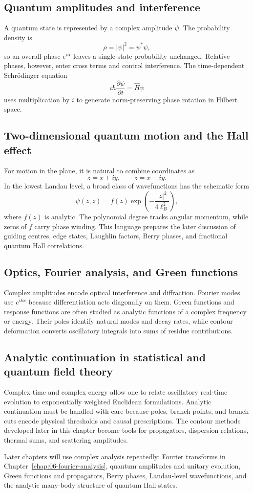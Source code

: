 \subsection{Quantum amplitudes and interference}
A quantum state is represented by a complex amplitude $\psi$. The probability density is
\[
\rho=|\psi|^2=\psi^*\psi,
\]
so an overall phase $e^{i\alpha}$ leaves a single-state probability unchanged. Relative phases, however, enter cross terms and control interference. The time-dependent Schr\"odinger equation
\[
i\hbar\frac{\partial\psi}{\partial t}=\hat H\psi
\]
uses multiplication by $i$ to generate norm-preserving phase rotation in Hilbert space.

\subsection{Two-dimensional quantum motion and the Hall effect}
For motion in the plane, it is natural to combine coordinates as
\[
z=x+iy,\qquad \bar z=x-iy.
\]
In the lowest Landau level, a broad class of wavefunctions has the schematic form
\[
\psi(z,\bar z)=f(z)\exp\!\left(-\frac{|z|^2}{4\ell_B^2}\right),
\]
where $f(z)$ is analytic. The polynomial degree tracks angular momentum, while zeros of $f$ carry phase winding. This language prepares the later discussion of guiding centres, edge states, Laughlin factors, Berry phases, and fractional quantum Hall correlations.

\subsection{Optics, Fourier analysis, and Green functions}
Complex amplitudes encode optical interference and diffraction. Fourier modes use $e^{ikx}$ because differentiation acts diagonally on them. Green functions and response functions are often studied as analytic functions of a complex frequency or energy. Their poles identify natural modes and decay rates, while contour deformation converts oscillatory integrals into sums of residue contributions.

\subsection{Analytic continuation in statistical and quantum field theory}
Complex time and complex energy allow one to relate oscillatory real-time evolution to exponentially weighted Euclidean formulations. Analytic continuation must be handled with care because poles, branch points, and branch cuts encode physical thresholds and causal prescriptions. The contour methods developed later in this chapter become tools for propagators, dispersion relations, thermal sums, and scattering amplitudes.

\begin{lookingaheadbox}
Later chapters will use complex analysis repeatedly: Fourier transforms in Chapter~\ref{chap:06-fourier-analysis}, quantum amplitudes and unitary evolution, Green functions and propagators, Berry phases, Landau-level wavefunctions, and the analytic many-body structure of quantum Hall states.
\end{lookingaheadbox}
